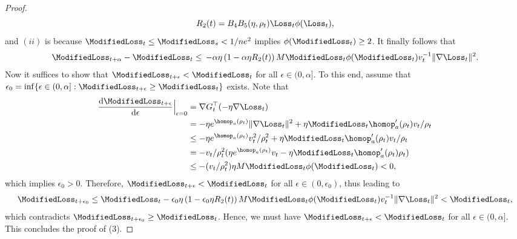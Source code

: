 \begin{proof}
\begin{equation*}
        R_2 (t) = B_4 B_5 (\eta, \rho_t) \Loss_t \phi(\Loss_t),
    \end{equation*}
    and $(ii)$ is because $\ModifiedLoss_t \le \ModifiedLoss_s < 1/ne^2$ implies $\phi(\ModifiedLoss_t) \ge 2$.
    It finally follows that
    \begin{align*}
        \ModifiedLoss_{t+\alpha} - \ModifiedLoss_t \le \, - \alpha \eta \left( 1- \alpha \eta R_2 (t) \right) M \ModifiedLoss_t \phi (\ModifiedLoss_t) v_t^{-1} \|\nabla \Loss_t\|^2.
    \end{align*}
    Now it suffices to show that $\ModifiedLoss_{t+\epsilon} < \ModifiedLoss_t$ for all $\epsilon \in (0, \alpha]$. To this end, assume that $\epsilon_0 = \inf \{ \epsilon \in (0, \alpha]: \ModifiedLoss_{t+\epsilon} \ge \ModifiedLoss_t \}$ exists. Note that
    \begin{align*}
        \frac{\mathrm{d} \ModifiedLoss_{t+\epsilon}}{\mathrm{d} \epsilon } \Big\vert_{\epsilon = 0} &=  \nabla G_{t}^\top (- \eta \nabla \Loss_t) \\ 
        &= -\eta e^{\homop_a(\rho_t)} \|\nabla \Loss_t\|^2 + \eta \ModifiedLoss_t \homop_a^\prime (\rho_t) v_t / \rho_t \\ 
        &\le -\eta e^{\homop_a(\rho_t)} v_t^2 /\rho_t^2 + \eta \ModifiedLoss_t \homop_a^\prime (\rho_t) v_t / \rho_t \\ 
        &= -v_t /\rho_t^2 (\eta e^{\homop_a(\rho_t)} v_t - \eta \ModifiedLoss_t \homop_a^\prime (\rho_t)  \rho_t)\\ 
        &\le - (v_t /\rho_t^2) \eta M \ModifiedLoss_t \phi(\ModifiedLoss_t) <0,
    \end{align*}
    which implies $\epsilon_0 > 0$. Therefore, $\ModifiedLoss_{t+\epsilon} < \ModifiedLoss_t$ for all $\epsilon \in (0, \epsilon_0)$, thus leading to
    \begin{equation*}
        \ModifiedLoss_{t + \epsilon_0} \le \ModifiedLoss_t - \epsilon_0 \eta \left( 1- \epsilon_0 \eta R_2 (t) \right) M \ModifiedLoss_t \phi (\ModifiedLoss_t) v_t^{-1} \|\nabla \Loss_t\|^2 < \ModifiedLoss_t,
    \end{equation*}
    which contradicts $\ModifiedLoss_{t + \epsilon_0} \ge \ModifiedLoss_t$. Hence, we must have $\ModifiedLoss_{t+\epsilon} < \ModifiedLoss_t$ for all $\epsilon \in (0, \alpha]$. This concludes the proof of (3).


\end{proof}
